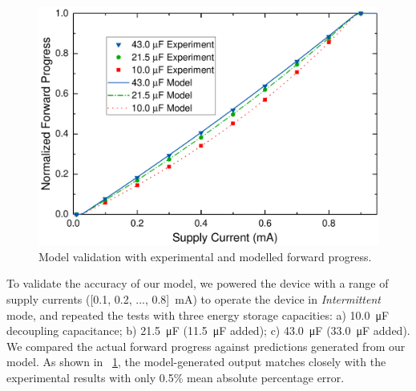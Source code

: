 

\begin{figure}[!t]
	\centering
	\includegraphics[width=0.8\columnwidth]{ch3_sizingeffect/figures/ModelValidFig} %
	\caption{Model validation with experimental and modelled forward progress. }
	\label{fig:modelvalid}
\end{figure}

To validate the accuracy of our model, we powered the device with a range of supply currents ([0.1, 0.2, ..., 0.8]\SI{}{\milli\ampere}) to operate the device in \textit{Intermittent} mode, and repeated the tests with three energy storage capacities: a) \SI{10.0}{\micro\farad} decoupling capacitance; b) \SI{21.5}{\micro\farad} (\SI{11.5}{\micro\farad} added); c) \SI{43.0}{\micro\farad} (\SI{33.0}{\micro\farad} added). We compared the actual forward progress against predictions generated from our model. As shown in \figurename{~\ref{fig:modelvalid}}, the model-generated output matches closely with the experimental results with only 0.5\% mean absolute percentage error. 

